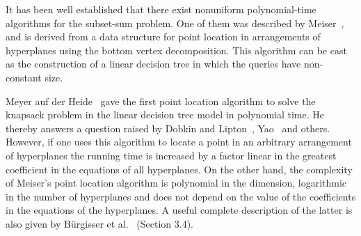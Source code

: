 It has been well established that there exist nonuniform
polynomial-time algorithms for the subset-sum problem. One of them was
described by Meiser~\cite{M93}, and is derived from a data structure for point
location in arrangements of hyperplanes using the bottom vertex decomposition.
This algorithm can be cast as the construction of a linear decision tree in which
the queries have non-constant size.

Meyer auf der Heide~\cite{M84} gave the first point location algorithm to solve the knapsack
problem in the linear decision tree model in polynomial time. He thereby
answers a question raised by Dobkin and Lipton~\cite{DL74,DL78}, Yao~\cite{Y82}
and others. However, if one uses this algorithm to locate a point in an
arbitrary arrangement of hyperplanes the running time is increased by a factor
linear in the greatest coefficient in the equations of all hyperplanes.
On the other hand, the complexity of Meiser's point location algorithm is
polynomial in the dimension, logarithmic in the number of hyperplanes and
does not depend on the value of the coefficients in the equations of the
hyperplanes. A useful complete description of the latter is also given by
Bürgisser et al.~\cite{B97} (Section 3.4).
